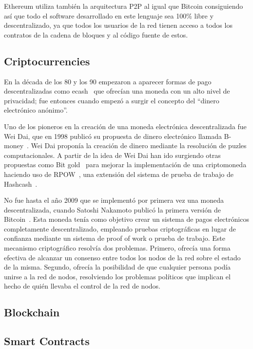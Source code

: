 Ethereum utiliza también la arquitectura P2P al igual que Bitcoin consiguiendo
así que todo el software desarrollado en este lenguaje sea 100\% libre y
descentralizado, ya que todos los usuarios de la red tienen acceso a todos los
contratos de la cadena de bloques y al código fuente de estos.
\subsection{Criptocurrencies}
\label{tb:cryptos}
En la década de los 80 y los 90 empezaron a aparecer formas de pago
descentralizadas como ecash~\cite{chaum1995introduction} que ofrecían una moneda
con un alto nivel de privacidad; fue entonces cuando empezó a surgir el concepto
del “dinero electrónico anónimo”.

Uno de los pioneros en la creación de una moneda electrónica descentralizada fue
Wei Dai, que en 1998 publicó su propuesta de dinero electrónico llamada
B-money~\cite{dai1998b}. Wei Dai proponía la creación de dinero mediante la
resolución de puzles computacionales. A partir de la idea de Wei Dai han ido
surgiendo otras propuestas como Bit gold~\cite{szabo2008bit} para mejorar la
implementación de una criptomoneda haciendo uso de RPOW~\cite{finney2005rpow},
una extensión del sistema de prueba de trabajo de Hashcash~\cite{back1997hash}.

No fue hasta el año 2009 que se implementó por primera vez una moneda
descentralizada, cuando Satoshi Nakamoto publicó la primera versión de
Bitcoin~\cite{nakamoto2008bitcoin}. Esta moneda tenía como objetivo crear un
sistema de pagos electrónicos completamente descentralizado, empleando pruebas
criptográficas en lugar de confianza mediante un sistema de proof of work o
prueba de trabajo. Este mecanismo criptográfico resolvía dos problemas. Primero,
ofrecía una forma efectiva de alcanzar un consenso entre todos los nodos de la
red sobre el estado de la misma. Segundo, ofrecía la posibilidad de que
cualquier persona podía unirse a la red de nodos, resolviendo los problemas
políticos que implican el hecho de quién llevaba el control de la red de nodos.


\subsection{Blockchain}
\label{tb:blockchain}
\lip

\subsection{Smart Contracts}
\label{tb:smartcontracts}
\lip

